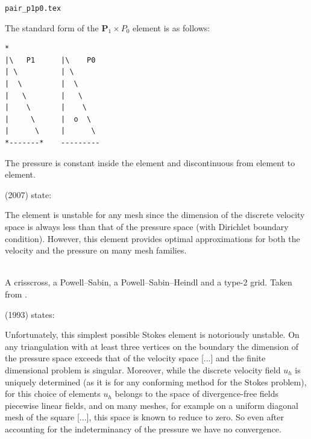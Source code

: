 \begin{flushright} {\tiny {\color{gray} \tt  pair\_p1p0.tex}} \end{flushright}

The standard form of the ${\bm P}_1 \times P_0$ element is as follows:
\begin{verbatim}
*          
|\   P1      |\    P0
| \          | \
|  \         |  \
|   \        |   \
|    \       |    \
|     \      |  o  \
|      \     |      \
*-------*    ---------
\end{verbatim}
The pressure is constant inside the element and discontinuous from element 
to element.

\textcite{qizh07b} (2007) state: 
\begin{displayquote}
{\color{darkgray}
The element is unstable for any mesh since
the dimension of the discrete velocity space is always less than that of the pressure space (with
Dirichlet boundary condition).
However, this element provides optimal approximations for both
the velocity and the pressure on many mesh families.} 
\end{displayquote}

\begin{center}
\\
{\captionfont A crisscross, a Powell–Sabin, a Powell–Sabin–Heindl and a type-2 grid.
Taken from \cite{qizh07}.}
\end{center}

\textcite{arno93} (1993) states: 
\begin{displayquote}
{\color{darkgray}
Unfortunately, this simplest possible Stokes element is notoriously unstable. On any 
triangulation with at least three vertices on the boundary the dimension of the pressure
space exceeds that of the velocity space [...] and the finite
dimensional problem is singular. 
Moreover, while the discrete velocity field $u_h$ is uniquely
determined (as it is for any conforming method for the Stokes problem), for this choice of
elements $u_h$ belongs to the space of divergence-free fields piecewise linear fields, and on
many meshes, for example on a uniform diagonal mesh of the square [...],
this space is known to reduce to zero. So even after accounting for the indeterminancy of
the pressure we have no convergence.}
\end{displayquote}

